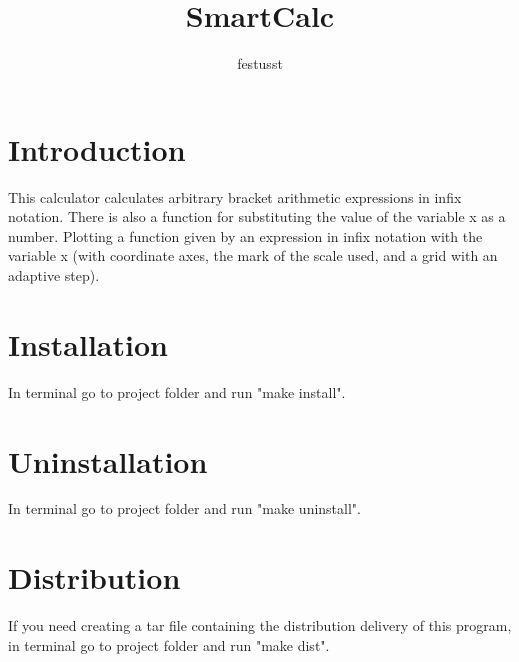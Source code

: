 \documentclass{article}
\title{SmartCalc}
\author{festusst}
\begin{document}
\maketitle

\section{Introduction}

This calculator calculates arbitrary bracket arithmetic expressions in infix notation. There is also a function for substituting the value of the variable x as a number.
Plotting a function given by an expression in infix notation with the variable x (with coordinate axes, the mark of the scale used, and a grid with an adaptive step).

\section{Installation}

In terminal go to project folder and run "make install".

\section{Uninstallation}

In terminal go to project folder and run "make uninstall".

\section{Distribution}
If you need creating a tar file containing the distribution
delivery of this program, in terminal go to project folder and run "make dist".
\end{document}
